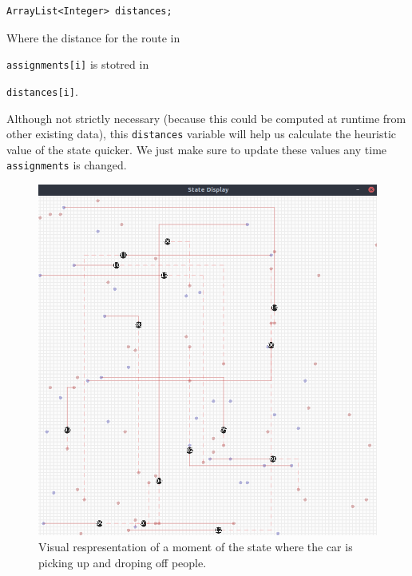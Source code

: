 \documentclass[12]{article}
\begin{document}
\begin{lstlisting}
ArrayList<Integer> distances;
\end{lstlisting}

Where the distance for the route in \raggedright\lstinline{assignments[i]} is stotred in \raggedright\lstinline{distances[i]}.

Although not strictly necessary (because this could be computed at runtime from other existing data), this \lstinline{distances} variable will help us calculate the heuristic value of the state quicker. We just make sure to update these values any time \lstinline{assignments} is changed.


\begin{figure}[H]
\captionsetup{justification=centering}
\centering
\includegraphics[scale=0.35]{images/carsMoving.png}
\caption{Visual respresentation of a moment of the state where the car is picking up and droping off people.}
\label{grid}
\end{figure}
\end{document}
